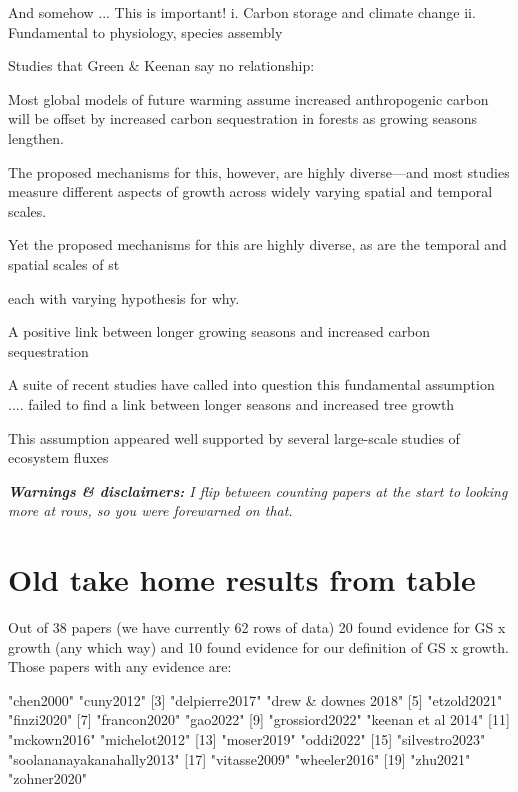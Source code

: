 \documentclass[11pt]{article}
\begin{document}
And somehow ... This is important!
i. Carbon storage and climate change
ii. Fundamental to physiology, species assembly

Studies that Green \& Keenan say no relationship:

Most global models of future warming assume increased anthropogenic carbon will be offset by increased carbon sequestration in forests as growing seasons lengthen.

The proposed mechanisms for this, however, are highly diverse---and most studies measure different aspects of growth across widely varying spatial and temporal scales. 

Yet the proposed mechanisms for this are highly diverse, as are the temporal and spatial scales of st


each with varying hypothesis for why. 

A positive link between longer growing seasons and increased carbon sequestration 

A suite of recent studies have called into question this fundamental assumption .... failed to find a link between longer seasons and increased tree growth

This assumption appeared well supported by several large-scale studies of ecosystem fluxes 



\newpage 
\emph{{\bf Warnings \& disclaimers:}
I flip between counting papers at the start to looking more at rows, so you were forewarned on that. }

\section{Old take home results from table}


Out of 38 papers (we have currently 62 rows of data) 20 found evidence for GS x growth (any which way) and  10 found evidence for our definition of GS x growth. Those papers with any evidence are:

\begin{Schunk}
\begin{Soutput}
 [1] "chen2000"                 "cuny2012"                
 [3] "delpierre2017"            "drew & downes 2018"      
 [5] "etzold2021"               "finzi2020"               
 [7] "francon2020"              "gao2022"                 
 [9] "grossiord2022"            "keenan et al 2014"       
[11] "mckown2016"               "michelot2012"            
[13] "moser2019"                "oddi2022"                
[15] "silvestro2023"            "soolananayakanahally2013"
[17] "vitasse2009"              "wheeler2016"             
[19] "zhu2021"                  "zohner2020"              
\end{Soutput}
\end{Schunk}
\end{document}
